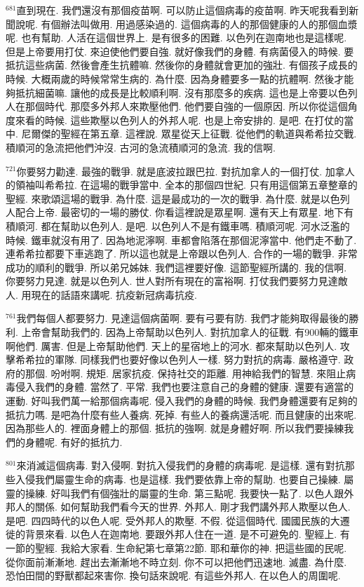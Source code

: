 \documentclass{book}
\begin{document}
$^{681}$直到現在.
我們還沒有那個疫苗啊.
可以防止這個病毒的疫苗啊.
昨天呢我看到新聞說呢.
有個辦法叫做用.
用過感染過的.
這個病毒的人的那個健康的人的那個血漿呢.
也有幫助.
人活在這個世界上.
是有很多的困難.
以色列在迦南地也是這樣呢.
但是上帝要用打仗.
來迫使他們要自強.
就好像我們的身體.
有病菌侵入的時候.
要抵抗這些病菌.
然後會產生抗體嘛.
然後你的身體就會更加的強壯.
有個孩子成長的時候.
大概兩歲的時候常常生病的.
為什麼.
因為身體要多一點的抗體啊.
然後才能夠抵抗細菌嘛.
讓他的成長是比較順利啊.
沒有那麼多的疾病.
這也是上帝要以色列人在那個時代.
那麼多外邦人來欺壓他們.
他們要自強的一個原因.
所以你從這個角度來看的時候.
這些欺壓以色列人的外邦人呢.
也是上帝安排的.
是吧.
在打仗的當中.
尼爾傑的聖經在第五章.
這裡說.
眾星從天上征戰.
從他們的軌道與希希拉交戰.
積順河的急流把他們沖沒.
古河的急流積順河的急流.
我的信啊.

$^{721}$你要努力勸達.
最強的戰爭.
就是底波拉跟巴拉.
對抗加拿人的一個打仗.
加拿人的領袖叫希希拉.
在這場的戰爭當中.
全本的那個四世紀.
只有用這個第五章整章的聖經.
來歌頌這場的戰爭.
為什麼.
這是最成功的一次的戰爭.
為什麼.
就是以色列人配合上帝.
最密切的一場的勝仗.
你看這裡說是眾星啊.
還有天上有眾星.
地下有積順河.
都在幫助以色列人.
是吧.
以色列人不是有鐵車嗎.
積順河呢.
河水泛濫的時候.
鐵車就沒有用了.
因為地泥濘啊.
車都會陷落在那個泥濘當中.
他們走不動了.
連希希拉都要下車逃跑了.
所以這也就是上帝跟以色列人.
合作的一場的戰爭.
非常成功的順利的戰爭.
所以弟兄姊妹.
我們這裡要好像.
這節聖經所講的.
我的信啊.
你要努力見達.
就是以色列人.
世人對所有現在的富裕啊.
打仗我們要努力見達敵人.
用現在的話語來講呢.
抗疫新冠病毒抗疫.

$^{761}$我們每個人都要努力.
見達這個病菌啊.
要有弓要有防.
我們才能夠取得最後的勝利.
上帝會幫助我們的.
因為上帝幫助以色列人.
對抗加拿人的征戰.
有900輛的鐵車啊他們.
厲害.
但是上帝幫助他們.
天上的星宿地上的河水.
都來幫助以色列人.
攻擊希希拉的軍隊.
同樣我們也要好像以色列人一樣.
努力對抗的病毒.
嚴格遵守.
政府的那個.
吩咐啊.
規矩.
居家抗疫.
保持社交的距離.
用神給我們的智慧.
來阻止病毒侵入我們的身體.
當然了.
平常.
我們也要注意自己的身體的健康.
還要有適當的運動.
好叫我們萬一給那個病毒呢.
侵入我們的身體的時候.
我們身體還要有足夠的抵抗力嗎.
是吧為什麼有些人養病.
死掉.
有些人的養病還活呢.
而且健康的出來呢.
因為那些人的.
裡面身體上的那個.
抵抗的強啊.
就是身體好啊.
所以我們要操練我們的身體呢.
有好的抵抗力.

$^{801}$來消滅這個病毒.
對入侵啊.
對抗入侵我們的身體的病毒呢.
是這樣.
還有對抗那些入侵我們屬靈生命的病毒.
也是這樣.
我們要依靠上帝的幫助.
也要自己操練.
屬靈的操練.
好叫我們有個強壯的屬靈的生命.
第三點呢.
我要快一點了.
以色人跟外邦人的關係.
如何幫助我們看今天的世界.
外邦人.
剛才我們講外邦人欺壓以色人.
是吧.
四四時代的以色人呢.
受外邦人的欺壓.
不假.
從這個時代.
國國民族的大遷徙的背景來看.
以色人在迦南地.
要跟外邦人住在一道.
是不可避免的.
聖經上.
有一節的聖經.
我給大家看.
生命紀第七章第22節.
耶和華你的神.
把這些國的民呢.
從你面前漸漸地.
趕出去漸漸地不時立刻.
你不可以把他們迅速地.
滅盡.
為什麼.
恐怕田間的野獸都起來害你.
換句話來說呢.
有這些外邦人.
在以色人的周圍呢.
\end{document}
